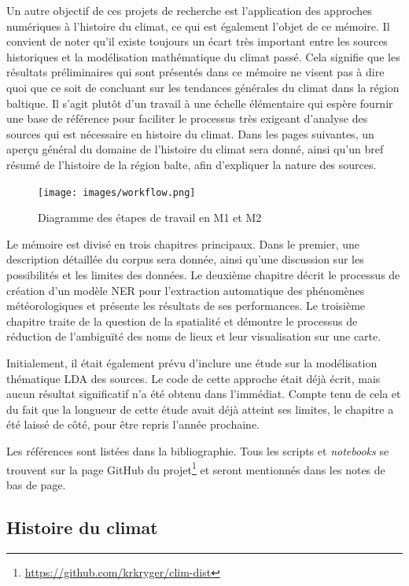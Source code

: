 \documentclass[a4paper,twoside,12pt]{article}
\begin{document}
Un autre objectif de ces projets de recherche est l'application des approches numériques à l'histoire du climat, ce qui est également l'objet de ce mémoire. Il convient de noter qu'il existe toujours un écart très important entre les sources historiques et la modélisation mathématique du climat passé. Cela signifie que les résultats préliminaires qui sont présentés dans ce mémoire ne visent pas à dire quoi que ce soit de concluant sur les tendances générales du climat dans la région baltique. Il s'agit plutôt d'un travail à une échelle élémentaire qui espère fournir une base de référence pour faciliter le processus très exigeant d'analyse des sources qui est nécessaire en histoire du climat. Dans les pages suivantes, un aperçu général du domaine de l'histoire du climat sera donné, ainsi qu'un bref résumé de l'histoire de la région balte, afin d'expliquer la nature des sources.

\begin{figure}[h]
    \centering
    \texttt{[image: images/workflow.png]}
    \caption{Diagramme des étapes de travail en M1 et M2}
    \label{fig:workflow}
\end{figure}


Le mémoire est divisé en trois chapitres principaux. Dans le premier, une description détaillée du corpus sera donnée, ainsi qu'une discussion sur les possibilités et les limites des données. Le deuxième chapitre décrit le processus de création d'un modèle NER pour l'extraction automatique des phénomènes météorologiques et présente les résultats de ses performances. Le troisième chapitre traite de la question de la spatialité et démontre le processus de réduction de l'ambiguïté des noms de lieux et leur visualisation sur une carte.

Initialement, il était également prévu d'inclure une étude sur la modélisation thématique LDA des sources. Le code de cette approche était déjà écrit, mais aucun résultat significatif n'a été obtenu dans l'immédiat. Compte tenu de cela et du fait que la longueur de cette étude avait déjà atteint ses limites, le chapitre a été laissé de côté, pour être repris l'année prochaine.

Les références sont listées dans la bibliographie. Tous les scripts et \textit{notebooks} se trouvent sur la page GitHub du projet\footnote{\url{https://github.com/krkryger/clim-dist}} et seront mentionnés dans les notes de bas de page.




\subsection*{Histoire du climat}
\end{document}
